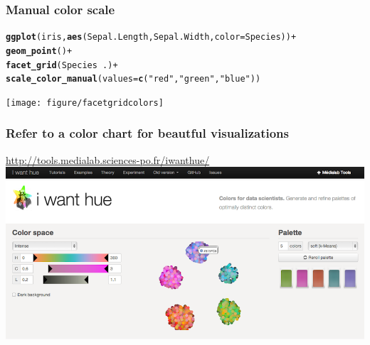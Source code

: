 \documentclass{beamer}\usepackage[]{graphicx}\usepackage[]{color}
\makeatletter
\newcommand{\hlstr}[1]{\textcolor[rgb]{0.192,0.494,0.8}{#1}}%
\newcommand{\hlkwd}[1]{\textcolor[rgb]{0.737,0.353,0.396}{\textbf{#1}}}%
\newenvironment{kframe}{%
 \def\at@end@of@kframe{}%
 \ifinner\ifhmode%
  \def\at@end@of@kframe{\end{minipage}}%
  \begin{minipage}{\columnwidth}%
 \fi\fi%
 \def\FrameCommand##1{\hskip\@totalleftmargin \hskip-\fboxsep
 \colorbox{shadecolor}{##1}\hskip-\fboxsep
     \hskip-\linewidth \hskip-\@totalleftmargin \hskip\columnwidth}%
 \MakeFramed {\advance\hsize-\width
   \@totalleftmargin\z@ \linewidth\hsize
   \@setminipage}}%
 {\par\unskip\endMakeFramed%
 \at@end@of@kframe}
\newenvironment{knitrout}{}{} %
\makeatother
\begin{document}

\begin{frame}[fragile]
\frametitle{Manual color scale}
\begin{knitrout}\footnotesize
{}\color{fgcolor}\begin{kframe}
\begin{alltt}
\hlkwd{ggplot}(iris, \hlkwd{aes}(Sepal.Length, Sepal.Width, color = Species)) +
\hlkwd{geom_point}() +
\hlkwd{facet_grid}(Species ~ .) +
\hlkwd{scale_color_manual}(values = \hlkwd{c}(\hlstr{"red"}, \hlstr{"green"}, \hlstr{"blue"}))
\end{alltt}
\end{kframe}

{\centering \texttt{[image: figure/facetgridcolors]} 

}



\end{knitrout}

\end{frame}


\begin{frame}[fragile]
\frametitle{Refer to a color chart for beautful visualizations}
\begin{center}
\url{http://tools.medialab.sciences-po.fr/iwanthue/}
\newline
\newline
\includegraphics[scale=0.25]{images/color_schemes.png}
\end{center}
\end{frame}

\end{document}
